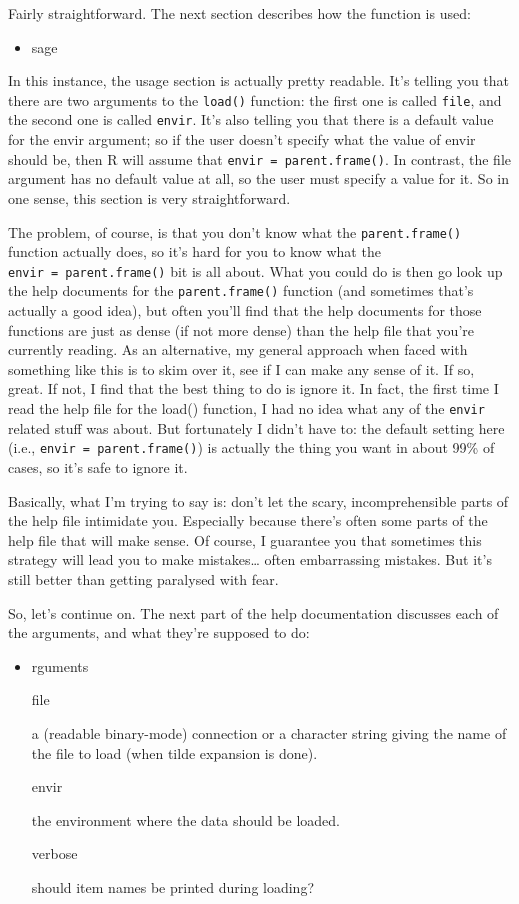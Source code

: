 \documentclass[
]{book}
\newenvironment{rmdnote}
  {\begin{rmdblock}}
  {\end{rmdblock}}
\newenvironment{rmdblock}[1]
  {
  \begin{itemize}
  \renewcommand{\labelitemi}{
    \raisebox{-.7\height}[0pt][0pt]{
      {\setkeys{Gin}{width=3em,keepaspectratio}}
    }
  }
  \setlength{\fboxsep}{1em}
  \item
  }
  {
  \end{itemize}
  }
\begin{document}
Fairly straightforward. The next section describes how the function is used:
\begin{rmdnote}
Usage
\end{rmdnote}

In this instance, the usage section is actually pretty readable. It's telling you that there are two arguments to the \texttt{load()} function: the ﬁrst one is called \texttt{file}, and the second one is called \texttt{envir}. It's also telling you that there is a default value for the envir argument; so if the user doesn't specify what the value of envir should be, then R will assume that \texttt{envir\ =\ parent.frame()}. In contrast, the file argument has no default value at all, so the user must specify a value for it. So in one sense, this section is very straightforward.

The problem, of course, is that you don't know what the \texttt{parent.frame()} function actually does, so it's hard for you to know what the \texttt{envir\ =\ parent.frame()} bit is all about. What you could do is then go look up the help documents for the \texttt{parent.frame()} function (and sometimes that's actually a good idea), but often you'll ﬁnd that the help documents for those functions are just as dense (if not more dense) than the help ﬁle that you're currently reading. As an alternative, my general approach when faced with something like this is to skim over it, see if I can make any sense of it. If so, great. If not, I ﬁnd that the best thing to do is ignore it. In fact, the ﬁrst time I read the help ﬁle for the load() function, I had no idea what any of the \texttt{envir} related stuﬀ was about. But fortunately I didn't have to: the default setting here (i.e., \texttt{envir\ =\ parent.frame()}) is actually the thing you want in about 99\% of cases, so it's safe to ignore it.

Basically, what I'm trying to say is: don't let the scary, incomprehensible parts of the help ﬁle intimidate you. Especially because there's often some parts of the help ﬁle that will make sense. Of course, I guarantee you that sometimes this strategy will lead you to make mistakes\ldots{} often embarrassing mistakes. But it's still better than getting paralysed with fear.

So, let's continue on. The next part of the help documentation discusses each of the arguments, and what they're supposed to do:
\begin{rmdnote}
Arguments

file

a (readable binary-mode) connection or a character string
giving the name of the file to load (when tilde expansion
is done).

envir

the environment where the data should be loaded.

verbose

should item names be printed during loading?
\end{rmdnote}
\end{document}

